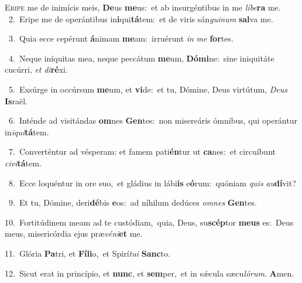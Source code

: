 \lettrine{\initial\textcolor{\initialcolor}{E}}{ripe} me de inimícis meis, \textbf{De}\-us \textbf{me}\-us:~\star et ab insurgéntibus in me \textit{lí}\-\textit{be}\textbf{ra} me.\\
{\numbfont\textcolor{\numbcolor}{~2.}}~Eripe me de operántibus in\-\textbf{i}\-qui\-\textbf{tá}\-tem:~\star et de viris sán\-\textit{gui}\-\textit{num} \textbf{sal}\-va me.\par
{\numbfont\textcolor{\numbcolor}{~3.}}~Quia ecce cepérunt \textbf{á}\-nimam \textbf{me}\-am:~\star irruérunt \textit{in} \textit{me} \textbf{for}\-tes.\par
{\numbfont\textcolor{\numbcolor}{~4.}}~Neque iníquitas mea, neque peccátum \textbf{me}\-um, \textbf{Dó}\-\textbf{mi}ne:~\star sine iniquitáte cucúrri, \textit{et} \textit{di}\-\textbf{ré}xi.\par
{\numbfont\textcolor{\numbcolor}{~5.}}~Exsúrge in occúrsum \textbf{me}\-um, et \textbf{vi}\-de:~\star et tu, Dómine, Deus virtútum, \textit{De}\-\textit{us} \textbf{Is}\-raël.\par
{\numbfont\textcolor{\numbcolor}{~6.}}~Inténde ad visitándas \textbf{om}\-nes \textbf{Gen}\-tes:~\star non misereáris ómnibus, qui operántur in\-\textit{i}\-\textit{qui}\textbf{tá}tem.\par
{\numbfont\textcolor{\numbcolor}{~7.}}~Converténtur ad vésperam: et famem pati\-\textbf{én}\-tur ut \textbf{ca}\-nes:~\star et circuíbunt \textit{ci}\-\textit{vi}\textbf{tá}tem.\par
{\numbfont\textcolor{\numbcolor}{~8.}}~Ecce loquéntur in ore suo,~\dagger et gládius in lábi\textbf{is} e\-\textbf{ó}\-rum:~\star quóniam \textit{quis} \textit{au}\-\textbf{dí}vit?\par
{\numbfont\textcolor{\numbcolor}{~9.}}~Et tu, Dómine, deri\-\textbf{dé}\-bis \textbf{e}\-os:~\star ad níhilum dedúces \textit{om}\-\textit{nes} \textbf{Gen}\-tes.\par
{\numbfont\textcolor{\numbcolor}{10.}}~Fortitúdinem meam ad te custódiam,~\dagger quia, Deus, su\-\textbf{scép}\-tor \textbf{me}\-\textbf{us} es:~\star Deus meus, misericórdia ejus præ\-\textit{vé}\-\textit{ni}\textbf{et} me.\par
{\numbfont\textcolor{\numbcolor}{11.}}~Glória \textbf{Pa}\-tri, et \textbf{Fí}\-\textbf{li}o,~\star et Spirí\-\textit{tu}\-\textit{i} \textbf{Sanc}\-to.\par
{\numbfont\textcolor{\numbcolor}{12.}}~Sicut erat in princípio, et \textbf{nunc}\-, et \textbf{sem}\-per,~\star et in sǽcula sæcu\-\textit{ló}\-\textit{rum}. \textbf{A}\-men.\par
